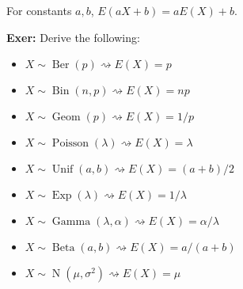 \documentclass[10pt,letterpaper]{article}
\newcommand{\n}{\hfill\break}
\newcommand{\hangblock}[2]{\par\noindent\settowidth{\hangindent}{\textbf{#1: }}\textbf{#1: }\nolinebreak#2}
\newcommand{\exer}[1]{\hangblock{Exer}{#1}}
\DeclareMathOperator{\Unif}{Unif}
\DeclareMathOperator{\Ber}{Ber}
\DeclareMathOperator{\Bin}{Bin}
\DeclareMathOperator{\Geom}{Geom}
\DeclareMathOperator{\Poisson}{Poisson}
\DeclareMathOperator{\Exp}{Exp}
\DeclareMathOperator{\Beta}{Beta}
\DeclareMathOperator{\Normal}{N}
\DeclareMathOperator{\DistGamma}{Gamma}
\begin{document}
\par\noindent
For constants $a,b$, $E(aX+b)=aE(X)+b$.\n

\exer{
	Derive the following:
	\begin{itemize}
		\item $X\sim\Ber(p)\rightsquigarrow{}E(X)=p$
		\item $X\sim\Bin(n,p)\rightsquigarrow{}E(X)=np$
		\item $X\sim\Geom(p)\rightsquigarrow{}E(X)=1/p$
		\item $X\sim\Poisson(\lambda)\rightsquigarrow{}E(X)=\lambda$
		\item $X\sim\Unif(a,b)\rightsquigarrow{}E(X)=(a+b)/2$
		\item $X\sim\Exp(\lambda)\rightsquigarrow{}E(X)=1/\lambda$
		\item $X\sim\DistGamma(\lambda,\alpha)\rightsquigarrow{}E(X)=\alpha/\lambda$
		\item $X\sim\Beta(a,b)\rightsquigarrow{}E(X)=a/(a+b)$
		\item $X\sim\Normal(\mu,\sigma^{2})\rightsquigarrow{}E(X)=\mu$
	\end{itemize}
}
\end{document}
